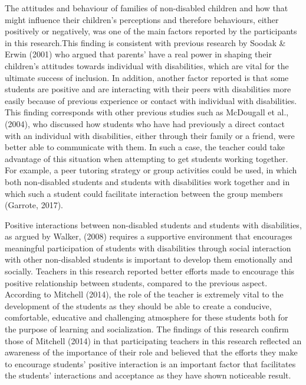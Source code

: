 \documentclass[11pt]{sig-alternate}
\begin{document}
\begin{large}
{The attitudes and behaviour of families of non-disabled children and how that might influence their children’s perceptions and therefore behaviours, either positively or negatively, was one of the main factors reported by the participants in this research.This finding is consistent with previous research by Soodak \& Erwin (2001) who argued that parents’ have a real power in shaping their children’s attitudes towards individual with disabilities, which are vital for the ultimate success of inclusion. In addition, another factor reported is that some students are positive and are interacting with their peers with disabilities more easily because of previous experience or contact with individual with disabilities. This finding corresponds with other previous studies such as McDougall et al., (2004), who discussed how students who have had previously a direct contact with an individual with disabilities, either through their family or a friend, were better able to communicate with them. In such a case, the teacher could take advantage of this situation when attempting to get students working together. For example, a peer tutoring strategy or group activities could be used, in which both non-disabled students and students with disabilities work together and in which such a student could facilitate interaction between the group members (Garrote, 2017). 

Positive interactions between non-disabled students and students with disabilities, as argued by Walker, (2008) requires a supportive environment that encourages meaningful participation of students with disabilities through social interaction with other non-disabled students is important to develop them emotionally and socially.  Teachers in this research reported better efforts made to encourage this positive relationship between students, compared to the previous aspect. According to Mitchell (2014), the role of the teacher is extremely vital to the development of the students as they should be able to create a conducive, comfortable, educative and challenging atmosphere for these students both for the purpose of learning and socialization. The findings of this research confirm those of Mitchell (2014) in that participating teachers in this research reflected an awareness of the importance of their role and believed that the efforts they make to encourage students’ positive interaction is an important factor that facilitates the students’ interactions and acceptance as they have shown noticeable result.

}
\end{large}
\end{document}
